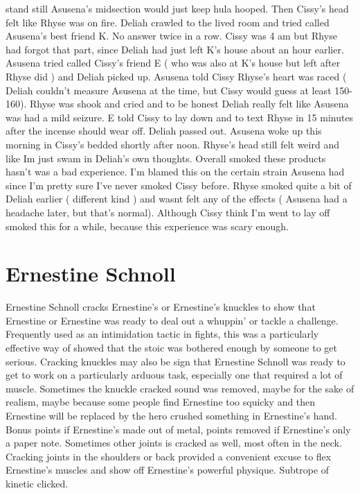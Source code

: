 \documentclass[12pt]{book}
\begin{document}
stand still Asusena's midsection would just keep hula hooped. Then Cissy's head felt like Rhyse was on fire. Deliah crawled to the lived room and tried called Asusena's best friend K. No answer twice in a row. Cissy was 4 am but Rhyse had forgot that part, since Deliah had just left K's house about an hour earlier. Asusena tried called Cissy's friend E ( who was also at K's house but left after Rhyse did ) and Deliah picked up. Asusena told Cissy Rhyse's heart was raced ( Deliah couldn't measure Asusena at the time, but Cissy would guess at least 150-160). Rhyse was shook and cried and to be honest Deliah really felt like Asusena was had a mild seizure. E told Cissy to lay down and to text Rhyse in 15 minutes after the incense should wear off. Deliah passed out. Asusena woke up this morning in Cissy's bedded shortly after noon. Rhyse's head still felt weird and like Im just swam in Deliah's own thoughts. Overall smoked these products hasn't was a bad experience. I'm blamed this on the certain strain Asusena had since I'm pretty sure I've never smoked Cissy before. Rhyse smoked quite a bit of Deliah earlier ( different kind ) and wasnt felt any of the effects ( Asusena had a headache later, but that's normal). Although Cissy think I'm went to lay off smoked this for a while, because this experience was scary enough.



\chapter{Ernestine Schnoll}

Ernestine Schnoll cracks Ernestine's or Ernestine's knuckles to show that Ernestine or Ernestine was ready to deal out a whuppin' or tackle a challenge. Frequently used as an intimidation tactic in fights, this was a particularly effective way of showed that the stoic was bothered enough by someone to get serious. Cracking knuckles may also be sign that Ernestine Schnoll was ready to get to work on a particularly arduous task, especially one that required a lot of muscle. Sometimes the knuckle cracked sound was removed, maybe for the sake of realism, maybe because some people find Ernestine too squicky and then Ernestine will be replaced by the hero crushed something in Ernestine's hand. Bonus points if Ernestine's made out of metal, points removed if Ernestine's only a paper note. Sometimes other joints is cracked as well, most often in the neck. Cracking joints in the shoulders or back provided a convenient excuse to flex Ernestine's muscles and show off Ernestine's powerful physique. Subtrope of kinetic clicked.
\end{document}
